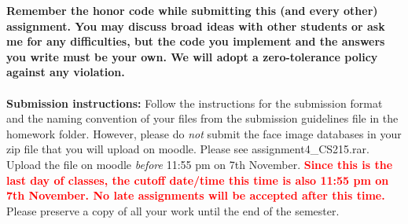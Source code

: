 \documentclass[11pt]{article}
\begin{document}
\maketitle

\textbf{Remember the honor code while submitting this (and every other) assignment. You may discuss broad ideas with other students or ask me for any difficulties, but the code you implement and the answers you write must be your own. We will adopt a \textbf{zero-tolerance policy} against any violation.}
\\
\\
\textbf{Submission instructions:} Follow the instructions for the submission format and the naming convention of your files from the submission guidelines file in the homework folder. However, please do \emph{not} submit the face image databases in your zip file that you will upload on moodle. Please see \textsf{assignment4\_CS215.rar}. Upload the file on moodle \emph{before} 11:55 pm on 7th November. \textbf{\textcolor{red}{Since this is the last day of classes, the cutoff date/time this time is also 11:55 pm on 7th November. No late assignments will be accepted after this time.}} Please preserve a copy of all your work until the end of the semester.  
\end{document}
